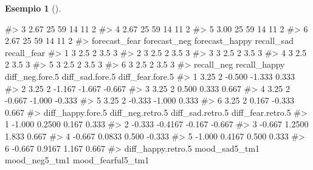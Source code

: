 \documentclass[
  letterpaper,
  DIV=11,
  numbers=noendperiod]{scrreprt}
\newenvironment{Shaded}{\begin{snugshade}}{\end{snugshade}}
\newcommand{\CommentTok}[1]{\textcolor[rgb]{0.37,0.37,0.37}{#1}}
\theoremstyle{definition}
\newtheorem{example}{Esempio}[chapter]
\theoremstyle{remark}
\begin{document}
\begin{example}[]
\begin{Shaded}
\begin{Highlighting}[]
\CommentTok{\#\textgreater{} 3         2.67       25      59        14          11            2}
\CommentTok{\#\textgreater{} 4         2.67       25      59        14          11            2}
\CommentTok{\#\textgreater{} 5         3.00       25      59        14          11            2}
\CommentTok{\#\textgreater{} 6         2.67       25      59        14          11            2}
\CommentTok{\#\textgreater{}   forecast\_fear forecast\_neg forecast\_happy recall\_sad recall\_fear}
\CommentTok{\#\textgreater{} 1             3          2.5              2        3.5           3}
\CommentTok{\#\textgreater{} 2             3          2.5              2        3.5           3}
\CommentTok{\#\textgreater{} 3             3          2.5              2        3.5           3}
\CommentTok{\#\textgreater{} 4             3          2.5              2        3.5           3}
\CommentTok{\#\textgreater{} 5             3          2.5              2        3.5           3}
\CommentTok{\#\textgreater{} 6             3          2.5              2        3.5           3}
\CommentTok{\#\textgreater{}   recall\_neg recall\_happy diff\_neg.fore.5 diff\_sad.fore.5 diff\_fear.fore.5}
\CommentTok{\#\textgreater{} 1       3.25            2          {-}0.500          {-}1.333            0.333}
\CommentTok{\#\textgreater{} 2       3.25            2          {-}1.167          {-}1.667           {-}0.667}
\CommentTok{\#\textgreater{} 3       3.25            2           0.500           0.333            0.667}
\CommentTok{\#\textgreater{} 4       3.25            2          {-}0.667          {-}1.000           {-}0.333}
\CommentTok{\#\textgreater{} 5       3.25            2          {-}0.333          {-}1.000            0.333}
\CommentTok{\#\textgreater{} 6       3.25            2           0.167          {-}0.333            0.667}
\CommentTok{\#\textgreater{}   diff\_happy.fore.5 diff\_neg.retro.5 diff\_sad.retro.5 diff\_fear.retro.5}
\CommentTok{\#\textgreater{} 1            {-}1.000           0.2500            0.167             0.333}
\CommentTok{\#\textgreater{} 2            {-}0.333          {-}0.4167           {-}0.167            {-}0.667}
\CommentTok{\#\textgreater{} 3            {-}0.667           1.2500            1.833             0.667}
\CommentTok{\#\textgreater{} 4            {-}0.667           0.0833            0.500            {-}0.333}
\CommentTok{\#\textgreater{} 5            {-}1.000           0.4167            0.500             0.333}
\CommentTok{\#\textgreater{} 6            {-}0.667           0.9167            1.167             0.667}
\CommentTok{\#\textgreater{}   diff\_happy.retro.5 mood\_sad5\_tm1 mood\_neg5\_tm1 mood\_fearful5\_tm1}

\end{Highlighting}
\end{Shaded}
\end{example}
\end{document}
